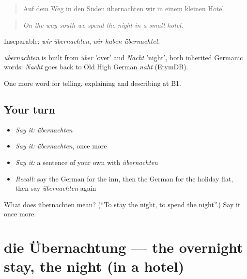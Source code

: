 \begin{quote}
Auf dem Weg in den Süden übernachten wir in einem kleinen Hotel.
\end{quote}

\begin{quote}
\emph{On the way south we spend the night in a small hotel.}
\end{quote}

Inseparable: \emph{wir übernachten}, \emph{wir haben übernachtet}.

\begin{cousinweb}
\emph{übernachten} is built from \emph{über} 'over' and \emph{Nacht} 'night', both inherited Germanic words: \emph{Nacht} goes back to Old High German \emph{naht} (EtymDB).
\end{cousinweb}

\begin{grammarlens}[title={What you've built}]
One more word for telling, explaining and describing at B1.
\end{grammarlens}

\subsection*{Your turn}
\begin{itemize}
\raggedright
  \item \emph{Say it:} \emph{übernachten}
  \item \emph{Say it:} \emph{übernachten}, once more
  \item \emph{Say it:} a sentence of your own with \emph{übernachten}
  \item \emph{Recall:} say the German for the inn, then the German for the holiday flat, then say \emph{übernachten} again
\end{itemize}

\begin{tcolorbox}[breakable,colback=teal!4,colframe=teal!35!black,title={Before you move on}]
What does übernachten mean? (\textquotedblleft{}To stay the night, to spend the night\textquotedblright{}.) Say it once more.
\end{tcolorbox}
\section[die Übernachtung]{die Übernachtung — the overnight stay, the night (in a hotel)}

\label{lesson:GE-C424-uebernachtung}



